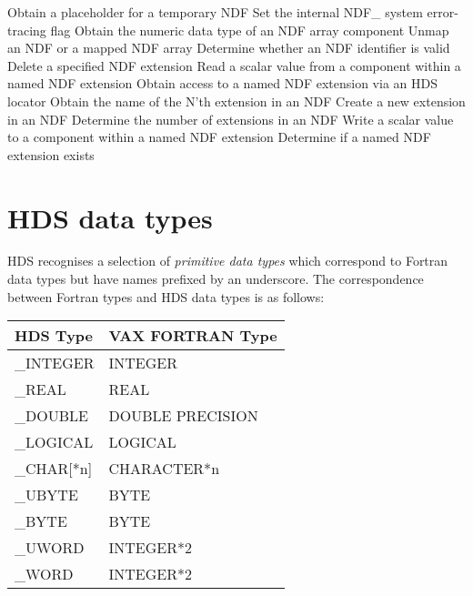 {\begin{description}{\addtolength{\itemindent}{-8mm}}
            {Obtain a placeholder for a temporary NDF}
            {Set the internal NDF\_ system error-tracing flag}
            {Obtain the numeric data type of an NDF array component}
            {Unmap an NDF or a mapped NDF array}
            {Determine whether an NDF identifier is valid}
            {Delete a specified NDF extension}
            {Read a scalar value from a component within a named NDF extension}
            {Obtain access to a named NDF extension via an HDS locator}
            {Obtain the name of the N'th extension in an NDF}
            {Create a new extension in an NDF}
            {Determine the number of extensions in an NDF}
            {Write a scalar value to a component within a named NDF extension}
            {Determine if a named NDF extension exists}
\end{description}
}

\newpage
\section{HDS data types\label{apxhds}}

HDS recognises a selection of {\sl primitive data types\/}
which correspond to Fortran data types but have names prefixed by an 
underscore. 
The correspondence between Fortran types and HDS data types is as follows:

\begin{center}
\begin{tabular}{|l|l|} \hline
{\bf HDS Type} & {\bf VAX FORTRAN Type}\\ \hline
\_INTEGER & INTEGER \\
\_REAL & REAL \\
\_DOUBLE & DOUBLE PRECISION\\
\_LOGICAL & LOGICAL \\
\_CHAR[*n] & CHARACTER*n \\
\_UBYTE & BYTE \\
\_BYTE & BYTE \\
\_UWORD & INTEGER*2 \\
\_WORD & INTEGER*2\\
\hline
\end{tabular}
\end{center}

